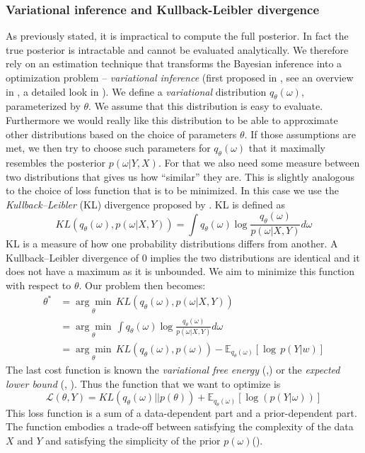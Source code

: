 \documentclass[12pt,a4paper,twoside]{scrartcl}
\numberwithin{equation}{section}
\begin{document}
\subsubsection{Variational inference and Kullback-Leibler divergence}\label{sec:var-inference}
As previously stated, it is impractical to compute the full posterior. In fact the true posterior is intractable and cannot be evaluated analytically. We therefore rely on an estimation technique that transforms the Bayesian inference into a optimization problem -- \emph{variational inference} (first proposed in \cite{jordan1999}, see an overview in \cite{blei2016}, a detailed look in \cite{fox2012}). We define a \emph{variational} distribution \(q_{\theta}(\omega)\), parameterized by \(\theta \). We assume that this distribution is easy to evaluate. Furthermore we would really like this distribution to be able to approximate other distributions based on the choice of parameters \(\theta\). If those assumptions are met, we then try to choose such parameters for \(q_{\theta}(\omega)\) that it maximally resembles the posterior \(p(\omega|Y,X)\). For that we also need some measure between two distributions that gives us how ``similar'' they are. This is slightly analogous to the choice of loss function that is to be minimized. In this case we use the \emph{Kullback–Leibler} (KL) divergence proposed by \cite{kullback1951}. KL is defined as
\begin{equation}
  KL(q_{\theta}(\omega), p(\omega | X, Y)) = \int q_{\theta}(\omega) \log \frac{q_{\theta}(\omega)}{p(\omega | X, Y)}d\omega 
\end{equation}
KL is a measure of how one probability distributions differs from another. A Kullback–Leibler divergence of \(0\) implies the two distributions are identical and it does not have a maximum as it is unbounded. We aim to minimize this function with respect to \(\theta\). Our problem then becomes:
\begin{align}
  \theta^* &= \underset{\theta}{\arg\min} \,  KL(q_{\theta}(\omega), p(\omega | X, Y))\\
           &= \underset{\theta}{\arg\min}\, \int q_{\theta}(\omega) \log \frac{q_{\theta}(\omega)}{p(\omega | X, Y)}d\omega \\
           & = \underset{\theta}{\arg\min}\,  KL(q_{\theta}(\omega), p(\omega)) - \mathbb{E}_{q_{\theta}(\omega)}[\log\, p(Y|w)]
\end{align}
The last cost function is known the \emph{variational free energy} (\cite{neal1998},\cite{blundell2015}) or the \emph{expected lower bound} (\cite{fox2012}, \cite{saul1996}). Thus the function that we want to optimize is
\begin{equation}
  \mathcal{L}(\theta, Y) = KL(q_{\theta}(\omega)||p(\theta)) + \mathbb{E}_{q_{\theta}(\omega)}[\log(p(Y|\omega))]
\end{equation}
This loss function is a sum of a data-dependent part and a prior-dependent part. The function embodies a trade-off between satisfying the complexity of the data \(X \text{ and } Y \) and satisfying the simplicity of the prior \(p(\omega)\)(\cite{blundell2015}).
\end{document}
